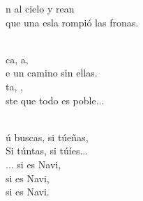 \begin{cancion}
	n al cielo y rean \\
	que una esla rompió las fronas. \\\jump\\
	\begin{chorus}%
	ca, a, \\
	e un camino sin ellas. \\
	ta, , \\
	ste que todo es poble... \\
	\end{chorus}%
	\jump\\
	ú buscas, si túeñas,  \\
	Si túntas, si túíes... \\
	... si es Navi,  \\
	si es Navi,  \\
	si es Navi.\\
\end{cancion}%
